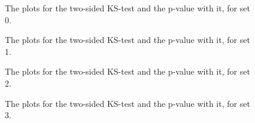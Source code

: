  \begin{figure}
    \centering
    \qquad
    \caption{The plots for the two-sided KS-test and the p-value with it, for set 0.}

  \end{figure}
   \begin{figure}
    \centering
    \qquad
    \caption{The plots for the two-sided KS-test and the p-value with it, for set 1.}

  \end{figure}
   \begin{figure}
    \centering
    \qquad
    \caption{The plots for the two-sided KS-test and the p-value with it, for set 2.}

  \end{figure}
   \begin{figure}
    \centering
    \qquad
    \caption{The plots for the two-sided KS-test and the p-value with it, for set 3.}
    
  \end{figure}
  
